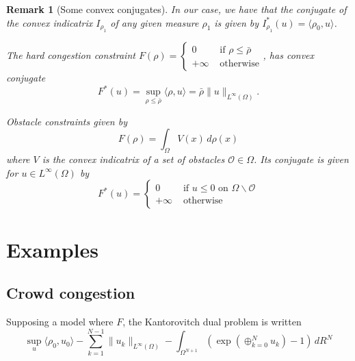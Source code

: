 \documentclass{article}
\newtheorem{remark}{Remark}
\begin{document}
	\begin{remark}[Some convex conjugates]
		In our case, we have that the conjugate of the convex indicatrix $I_{\rho_1}$ of any given measure $\rho_1$ is given by $I_{\rho_1}^*(u) = \langle \rho_0, u\rangle$.
		
		The hard congestion constraint $F(\rho) = \begin{cases}
		0&\text{ if }\rho\leq \bar{\rho} \\
		+\infty&\text{ otherwise}
		\end{cases}$, has convex conjugate
		\[
			F^*(u) = \sup_{\rho\leq \bar{\rho}}\langle \rho, u\rangle = \bar{\rho}\|u\|_{L^\infty(\Omega)}
			.
		\]
		
		Obstacle constraints given by
		\[
			F(\rho) = \int_\Omega V(x)\,d\rho(x) 
		\]
		where $V$ is the convex indicatrix of a set of obstacles $\mathscr{O} \in \Omega$. Its conjugate is given for $u\in L^\infty(\Omega)$ by
		\[
			F^*(u) = \begin{cases}
			0& \text{ if } u \leq 0\text{ on }\Omega\backslash\mathscr{O} \\
			+\infty& \text{ otherwise}
			\end{cases}
		\]
	\end{remark}
    
    
    
    
    
    \section{Examples}
    
    \subsection{Crowd congestion}
    
    Supposing a model where $F$, the Kantorovitch dual problem is written
    \begin{equation}
    \sup_u{} \langle\rho_0, u_0\rangle
    - \sum_{k=1}^{N-1} \| u_k\|_{L^\infty(\Omega)} - \int_{\Omega^{N+1}}\left(\exp(\oplus_{k=0}^Nu_k)-1\right)\,dR^N
    \end{equation}
    
    
    
    \printbibliography{}
    
    
    
    
    
    
    
\end{document}
